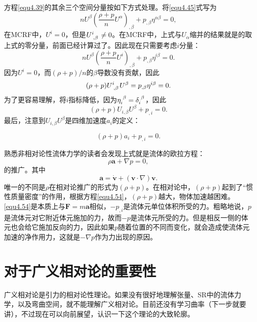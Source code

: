 方程\eqref{equ4.39}的其余三个空间分量按如下方式处理。将\eqref{equ4.45}式写为
\[
    n U^\beta \left( \frac{\rho + p}{n} U^\alpha \right)_{, \beta} + p_{, \beta} \eta^{\alpha \beta} = 0,
\]
在MCRF中，$U^i = 0$，但是$U\indices{^i_{, \beta}} \neq 0$。在MCRF中，上式与$U_\alpha$缩并的结果就是的取上式的零分量，前面已经计算过了。因此现在只需要考虑$i$分量：
\begin{equation}
    n U^\beta \left( \frac{\rho + p}{n} U^i \right)_{, \beta} + p_{, \beta} \eta^{i \beta} = 0.
\label{equ4.51}
\end{equation}
因为$U^i = 0$，而$(\rho + p) / n$的$\beta$导数没有贡献，因此
\begin{equation}
    (\rho + p) U\indices{^i_{, \beta}} U^\beta = p_{, \beta} \eta^{i \beta} = 0.
\label{equ4.52}
\end{equation}
为了更容易理解，将$i$指标降低，因为$\eta\indices{_i^\beta} = \delta\indices{_i^\beta}$，因此
\begin{equation}
    (\rho + p) U_{i, \beta} U^\beta + p_{, i} = 0.
\label{equ4.53}
\end{equation}
最后，注意到$U_{i, \beta} U^\beta$是四维加速度$a_i$的定义：
\begin{shaded}
\begin{equation}
    (\rho + p) a_i + p_{, i} = 0.
\label{equ4.54}
\end{equation}
\end{shaded}
熟悉非相对论性流体力学的读者会发现上式就是流体的欧拉方程：
\begin{equation}
    \rho \bm{a} + \nabla p = 0, \label{equ4.55}
\end{equation}
的推广。其中
\begin{equation}
    \bm{a} = \dot{\bm{v}} + (\bm{v} \cdot \nabla) \bm{v}.
\label{equ4.56}
\end{equation}
唯一的不同是$\rho$在相对论推广的形式为$(\rho + p)$。在相对论中，$(\rho + p)$起到了“惯性质量密度”的作用，根据方程\eqref{equ4.54}，$(\rho + p)$越大，物体加速越困难。\eqref{equ4.54}是本质上与$\bm{F} = m\bm{a}$相似，$-p_{, i}$是流体元单位体积所受的力。粗略地说，$p$是流体元对它附近体元施加的力，故而$-p$是流体元所受的力。但是相反一侧的体元也会给它施加反向的力，因此如果$p$随着位置的不同而变化，就会造成使流体元加速的净作用力，这就是$-\nabla p$作为力出现的原因。


\section{对于广义相对论的重要性}
\label{sec4.7}
广义相对论是引力的相对论性理论。如果没有很好地理解张量、SR中的流体力学，以及弯曲空间，就不能理解广义相对论。目前还没有学习曲率（下一步就要讲），不过现在可以向前展望，认识一下这个理论的大致轮廓。

